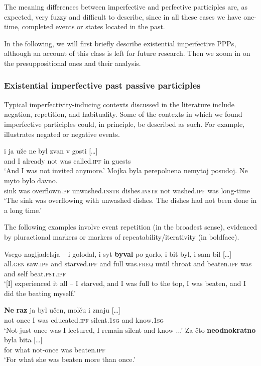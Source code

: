 \documentclass[output=paper,
modfonts,
newtxmath,
hidelinks
]{langscibook}
\begin{document}
\noindent The meaning differences between imperfective and perfective participles are, as expected, very fuzzy and difficult to describe, since in all these cases we have one-time, completed events or states located in the past. 

In the following,  we will first briefly describe existential imperfective PPPs, although an account of this class is left for future research. Then we  zoom in on the presuppositional ones and their analysis.

\subsubsection{Existential imperfective past passive participles}

Typical imperfectivity-inducing contexts discussed in the literature include negation, repetition, and habituality. Some of the contexts in which we found imperfective participles could, in principle, be described as such. For example,  illustrates negated or negative events. 

\ea\label{negOF}
\ea\gll	[\dots] i ja uže ne byl zvan v gosti [\dots]\\
	{} and I already not was called.\textsc{ipf} in guests \\
\glt `And I was not invited anymore.' 
\ex\gll	Mojka byla perepolnena nemytoj posudoj. Ne myto bylo davno.\\
   	sink was overflown.\textsc{pf} unwashed.\textsc{instr} dishes.\textsc{instr} not washed.\textsc{ipf} was long-time\\
\glt	`The sink was overflowing with unwashed dishes. The dishes had not been done in a long time.'\label{17c}
\z\z

\noindent The following examples involve event repetition (in the broadest sense), evidenced by pluractional markers  or markers of repeatability/iterativity  (in boldface).

\ea\gll	Vsego nagljadelsja -- i golodal, i syt \textbf{byval} po gorlo, i bit byl, i sam bil [\dots] \label{golodal}\\
	all.\textsc{gen} saw.\textsc{ipf} {} and starved.\textsc{ipf} and full was.\textsc{freq} until throat and beaten.\textsc{ipf} was and self beat.\textsc{pst}.\textsc{ipf}\\
\glt	`[I] experienced it all -- I starved, and I was full to the top, I was beaten, and I did the beating myself.'\label{bit} 
\z

\ea\label{neraz}
\ea\gll	\textbf{Ne} \textbf{raz} ja byl učen, molču i znaju [\dots]\\ 
	not once I was educated.\textsc{ipf} silent.\textsc{1sg} and know.\textsc{1sg}\\
\glt	`Not just once was I lectured, I remain silent and know ...'
\ex\gll	Za čto \textbf{neodnokratno} byla bita [\dots]\\
	for what not-once was beaten.\textsc{ipf}\\
\glt	`For what she was beaten more than once.'
\z\z
	
\end{document}
